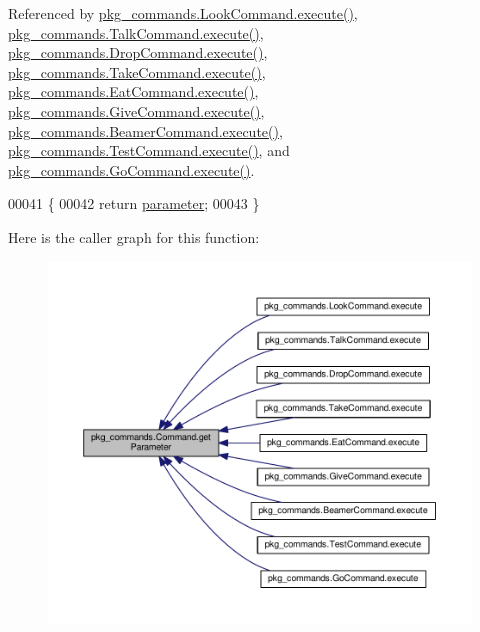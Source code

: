 Referenced by \hyperlink{LookCommand_8java_source_l00026}{pkg\-\_\-commands.\-Look\-Command.\-execute()}, \hyperlink{TalkCommand_8java_source_l00027}{pkg\-\_\-commands.\-Talk\-Command.\-execute()}, \hyperlink{DropCommand_8java_source_l00027}{pkg\-\_\-commands.\-Drop\-Command.\-execute()}, \hyperlink{TakeCommand_8java_source_l00027}{pkg\-\_\-commands.\-Take\-Command.\-execute()}, \hyperlink{EatCommand_8java_source_l00028}{pkg\-\_\-commands.\-Eat\-Command.\-execute()}, \hyperlink{GiveCommand_8java_source_l00029}{pkg\-\_\-commands.\-Give\-Command.\-execute()}, \hyperlink{BeamerCommand_8java_source_l00030}{pkg\-\_\-commands.\-Beamer\-Command.\-execute()}, \hyperlink{TestCommand_8java_source_l00032}{pkg\-\_\-commands.\-Test\-Command.\-execute()}, and \hyperlink{GoCommand_8java_source_l00032}{pkg\-\_\-commands.\-Go\-Command.\-execute()}.


\begin{DoxyCode}
00041                                  \{
00042         \textcolor{keywordflow}{return} \hyperlink{classpkg__commands_1_1Command_a089fe1b30b43b2ad5f0dcb2f0ffc2fdd}{parameter};
00043     \}
\end{DoxyCode}


Here is the caller graph for this function\-:
\nopagebreak
\begin{figure}[H]
\begin{center}
\leavevmode
\includegraphics[width=350pt]{classpkg__commands_1_1Command_a41c92d445be73ea9d62320c65efb8434_icgraph}
\end{center}
\end{figure}


